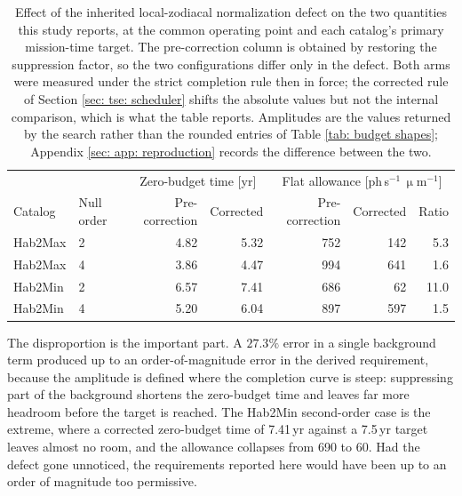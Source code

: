 \documentclass[12pt,a4paper]{article}
\numberwithin{equation}{section}
\numberwithin{figure}{section}
\numberwithin{table}{section}
\begin{document}
\begin{table}[htbp]
\centering
\small
\begin{tabular}{@{}llrrrrr@{}}
\toprule
        &            & \multicolumn{2}{c}{Zero-budget time [yr]} & \multicolumn{3}{c}{Flat allowance [ph\,s$^{-1}$\,$\upmu$m$^{-1}$]} \\
Catalog & Null order & Pre-correction & Corrected & Pre-correction & Corrected & Ratio \\
\midrule
Hab2Max & 2 & 4.82 & 5.32 & 752 & 142 & 5.3 \\
Hab2Max & 4 & 3.86 & 4.47 & 994 & 641 & 1.6 \\
Hab2Min & 2 & 6.57 & 7.41 & 686 & 62  & 11.0 \\
Hab2Min & 4 & 5.20 & 6.04 & 897 & 597 & 1.5 \\
\bottomrule
\end{tabular}
\caption{Effect of the inherited local-zodiacal normalization defect on the two quantities this study reports, at the common operating point and each catalog's primary mission-time target. The pre-correction column is obtained by restoring the suppression factor, so the two configurations differ only in the defect. Both arms were measured under the strict completion rule then in force; the corrected rule of Section \ref{sec: tse: scheduler} shifts the absolute values but not the internal comparison, which is what the table reports. Amplitudes are the values returned by the search rather than the rounded entries of Table \ref{tab: budget shapes}; Appendix \ref{sec: app: reproduction} records the difference between the two.}
\label{tab: localzodi impact}
\end{table}

The disproportion is the important part. A $27.3\%$ error in a single background term produced up to an order-of-magnitude error in the derived requirement, because the amplitude is defined where the completion curve is steep: suppressing part of the background shortens the zero-budget time and leaves far more headroom before the target is reached. The Hab2Min second-order case is the extreme, where a corrected zero-budget time of 7.41\,yr against a 7.5\,yr target leaves almost no room, and the allowance collapses from 690 to 60. Had the defect gone unnoticed, the requirements reported here would have been up to an order of magnitude too permissive.
\end{document}
